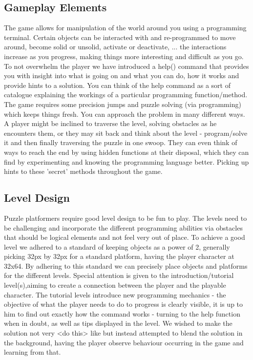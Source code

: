 \documentclass[a4paper,twoside,12pt]{article}
\begin{document}
\subsection{Gameplay Elements}
The game allows for manipulation of the world around you using a programming terminal. Certain objects can be interacted with and re-programmed to move around, become solid or unsolid, activate or deactivate, ...
the interactions increase as you progress, making things more interesting and difficult as you go. To not overwhelm the player we have introduced a help() command that provides you with insight into what is going on and what you can do, how it works and provide hints to a solution. You can think of the help command as a sort of catalogue explaining the workings of a particular programming function/method. The game requires some precision jumps and puzzle solving (via programming) which keeps things fresh. You can approach the problem in many different ways. A player might be inclined to traverse the level, solving obstacles as he encounters them, or they may sit back and think about the level - program/solve it and then finally traversing the puzzle in one swoop. They can even think of ways to reach the end by using hidden functions at their disposal, which they can find by experimenting and knowing the programming language better. Picking up hints to these 'secret' methods throughout the game.

\subsection{Level Design}

Puzzle platformers require good level design to be fun to play. The levels need to be challenging and incorporate the different programming abilities via obstacles that should be logical elements and not feel very out of place. To achieve a good level we adhered to a standard of keeping objects as a power of 2, generally picking 32px by 32px for a standard platform, having the player character at 32x64. By adhering to this standard we can precisely place objects and platforms for the different levels.
Special attention is given to the introduction/tutorial level(s),aiming to create a connection between the player and the playable character. The tutorial levels introduce new programming mechanics - the objective of what the player needs to do to progress is clearly visible, it is up to him to find out exactly how the command works - turning to the help function when in doubt, as well as tips displayed in the level. We wished to make the solution not very <do this> like but instead attempted to blend the solution in the background, having the player observe behaviour occurring in the game and learning from that. %
\end{document}
